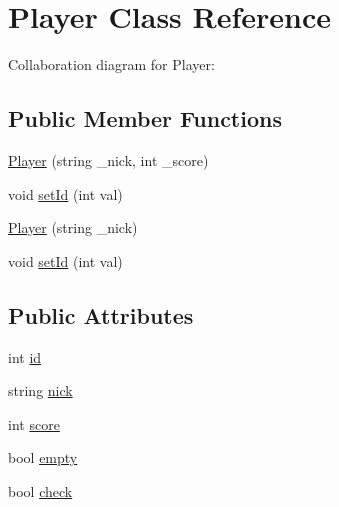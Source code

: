 \hypertarget{classPlayer}{\section{Player Class Reference}
\label{classPlayer}
}


Collaboration diagram for Player\-:
\subsection*{Public Member Functions}
\begin{DoxyCompactItemize}
\item 
\hyperlink{classPlayer_abdbd6b6f0fec2df19dd23d3129cbadb9}{Player} (string \-\_\-nick, int \-\_\-score)
\item 
void \hyperlink{classPlayer_aae48749805799debc558ad74c2cfbc8d}{set\-Id} (int val)
\item 
\hyperlink{classPlayer_aa206440e032fa4a2ff1ea4ebf7814897}{Player} (string \-\_\-nick)
\item 
void \hyperlink{classPlayer_aae48749805799debc558ad74c2cfbc8d}{set\-Id} (int val)
\end{DoxyCompactItemize}
\subsection*{Public Attributes}
\begin{DoxyCompactItemize}
\item 
int \hyperlink{classPlayer_a05e05f3a23de78da7ec032ec2bcf8c6c}{id}
\item 
string \hyperlink{classPlayer_aea2f8abddadf8deb423a3c9b507d1ccc}{nick}
\item 
int \hyperlink{classPlayer_ace6abae8d66534ad0a1fd6458f786a6e}{score}
\item 
bool \hyperlink{classPlayer_a8039b9f17594c036c3bd7b676a24b19e}{empty}
\item 
bool \hyperlink{classPlayer_a1b72316124caf757250c3cee1c4416ff}{check}
\end{DoxyCompactItemize}


